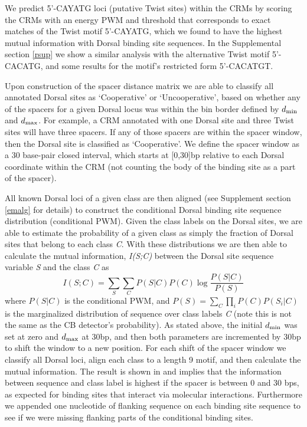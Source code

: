 We predict 5'-CAYATG loci (putative Twist sites) within the CRMs by scoring the CRMs with an energy PWM and threshold that corresponds to exact matches of the Twist motif 5'-CAYATG, which we found to have the highest mutual information with Dorsal binding site sequences.  In the Supplemental section \ref{rsup} we show a similar analysis with the alternative Twist motif 5'-CACATG, and some results for the motif's restricted form 5'-CACATGT.

Upon construction of the spacer distance matrix we are able to classify all annotated Dorsal sites as `Cooperative' or `Uncooperative', based on whether any of the spacers for a given Dorsal locus was within the bin border defined by $d_{\rm min}$ and $d_{\rm max}$.  For example, a CRM annotated with one Dorsal site and three Twist sites will have three spacers.  If any of those spacers are within the spacer window, then the Dorsal site is classified as `Cooperative'.  We define the spacer window as a 30 base-pair closed interval, which starts at [0,30]bp relative to each Dorsal coordinate within the CRM (not counting the body of the binding site as a part of the spacer).

All known Dorsal loci of a given class are then aligned (see Supplement section \ref{emalg} for details) to construct the conditional Dorsal binding site sequence distribution (conditional PWM).  Given the class labels on the Dorsal sites, we are able to estimate the probability of a given class as simply the fraction of Dorsal sites that belong to each class \textit{C}.  With these distributions we are then able to calculate the mutual information, \textit{I(S;C)} between the Dorsal site sequence variable \textit{S} and the class \textit{C} as
\begin{equation}\label{mi}
I(S;C)= \sum_S \sum_C P(S|C) P(C) \log{\frac{P(S|C)}{P(S)} }
\end{equation}
where $P(S|C)$ is the conditional PWM, and $P(S)=\sum_C\prod_i P(C)P(S_i|C)$ is the marginalized distribution of sequence over class labels \textit{C} (note this is not the same as the CB detector's probability).  As stated above, the initial $d_{\rm min}$ was set at zero and $d_{\rm max}$ at 30bp, and then both parameters are incremented by 30bp to shift the window to a new position.  For each shift of the spacer window we classify all Dorsal loci, align each class to a length 9 motif, and then calculate the mutual information. The result is shown in  and implies that the information between sequence and class label is highest if the spacer is between 0 and 30 bps, as expected for binding sites that interact via molecular interactions.  Furthermore we appended one nucleotide of flanking sequence on each binding site sequence to see if we were missing flanking parts of the conditional binding sites.

